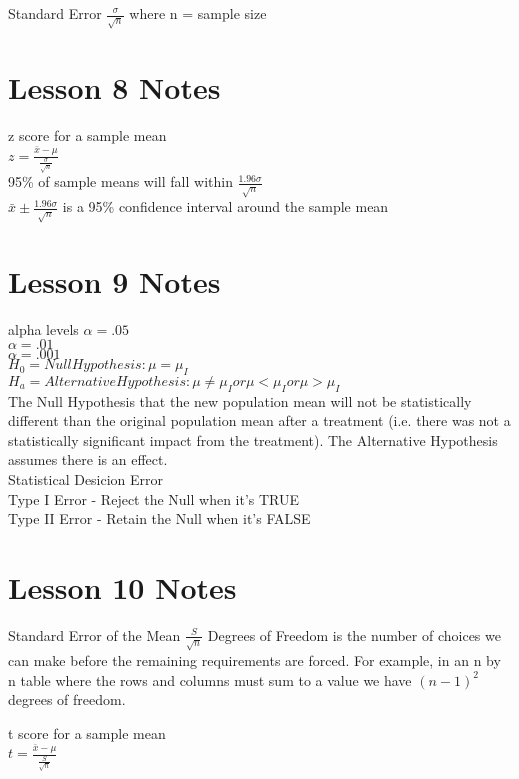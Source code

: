 \documentclass{article}
\begin{document}
Standard Error
\( \frac{\sigma}{\sqrt{n}}\)
where n = sample size

\section{Lesson 8 Notes}
z score for a sample mean\\
\( z = \frac{\bar{x}-\mu}{\frac{\sigma}{\sqrt{n}}} \)\\
95\% of sample means will fall within \( \frac{1.96\sigma}{\sqrt{n}} \)\\
\( \bar{x} \pm \frac{1.96\sigma}{\sqrt{n}} \) is a 95\% confidence interval around the sample mean

\section{Lesson 9 Notes}
alpha levels
\( \alpha = .05 \)\\
\( \alpha = .01 \)\\
\( \alpha = .001 \)\\

\( H_0 = Null Hypothesis: \mu = \mu_I \)\\
\( H_a = Alternative Hypothesis: \mu \neq \mu_I or \mu < \mu_I or \mu > \mu_I \)\\
The Null Hypothesis that the new population mean will not be statistically different than the original population mean after a treatment (i.e. there was not a statistically significant impact from the treatment).
The Alternative Hypothesis assumes there is an effect.\\

Statistical Desicion Error\\
Type I Error - Reject the Null when it's TRUE\\
Type II Error - Retain the Null when it's FALSE

\section{Lesson 10 Notes}

Standard Error of the Mean
\( \frac{S}{\sqrt{n}} \)
Degrees of Freedom is the number of choices we can make before the remaining requirements are forced.
For example, in an n by n table where the rows and columns must sum to a value we have \( (n-1)^2 \) degrees of freedom.

t score for a sample mean\\
\( t = \frac{\bar{x}-\mu}{\frac{S}{\sqrt{n}}} \)\\
\end{document}

